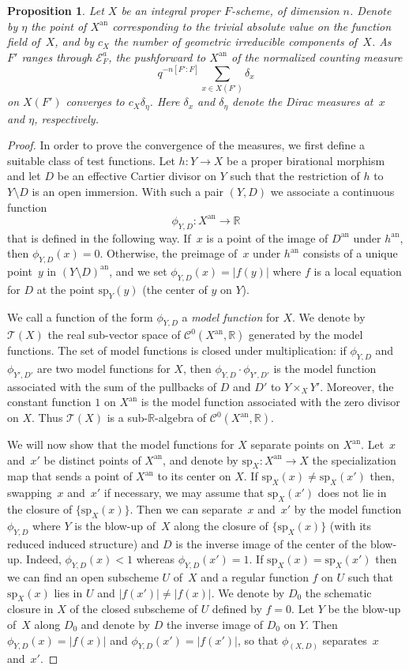 \documentclass[JEP,XML,SOM,Unicode,NoFloatCountersInSection]{cedram}
\let\mathcal\mathscr
\newtheorem{prop}[equation]{Proposition}
\theoremstyle{definition}
\numberwithin{equation}{subsection}
\newcommand{\R}{\ensuremath{\mathbb{R}}}
\newcommand{\an}{\mathrm{an}}
\newcommand{\spe}{\mathrm{sp}}
\begin{document}
\begin{prop}\label{prop:langweil}
Let $X$ be an integral proper $F$-scheme, of dimension $n$.
Denote by $\eta$ the point of $X^{\an}$ corresponding to the trivial absolute value on the function field of~$X$, and by $c_X$ the number of geometric irreducible components of~$X$.
As $F'$ ranges through $\mathcal{E}_F^a$, the pushforward to $X^{\an}$ of the normalized counting measure
\[
q^{-n[F'\colon F]}\sum_{x\in X(F')}\delta_x
\]
on $X(F')$
converges to $c_X\delta_{\eta}$. Here
$\delta_x$ and $\delta_\eta$ denote the Dirac measures at~$x$ and $\eta$, respectively.
\end{prop}
\begin{proof}
In order to prove the convergence of the measures, we first define a suitable class of test functions. Let $h\colon Y\to X$ be a proper birational morphism and let $D$ be an effective Cartier divisor on $Y$ such that the restriction of $h$ to $Y\setminus D$ is an open immersion. With such a pair $(Y,D)$ we associate a continuous function
\[
\phi_{Y,D}\colon X^{\an}\to \R
\]
that is defined in the following way.
If~$x$ is a point of the image of $D^{\an}$ under $h^{\an}$, then $\phi_{Y,D}(x)=0$.
Otherwise, the preimage of~$x$ under $h^{\an}$ consists of a unique point~$y$ in $(Y\setminus D)^{\an}$, and we set $\phi_{Y,D}(x)=|f(y)|$ where $f$ is a local equation for $D$ at the point $\spe_{Y}(y)$ (the center of $y$ on $Y$).

We call a function of the form $\phi_{Y,D}$ a {\em model function} for $X$.
We denote by $\mathcal{T}(X)$ the real sub-vector space of $\mathcal{C}^0(X^{\an},\R)$ generated by the model functions.
The set of model functions is closed under multiplication: if $\phi_{Y,D}$ and $\phi_{Y',D'}$ are two model functions for $X$, then $\phi_{Y,D}\cdot \phi_{Y',D'}$ is the model function associated with the sum of the pullbacks of $D$ and $D'$ to $Y\times_X Y'$.
Moreover, the constant function $1$ on $X^{\an}$ is the model function associated with the zero divisor on $X$.
Thus $\mathcal{T}(X)$ is a sub-$\R$-algebra of $\mathcal{C}^0(X^{\an},\R)$.

We will now show that the model functions for $X$ separate points on $X^{\an}$. Let~$x$ and~$x'$ be distinct points of $X^{\an}$, and denote by $\spe_X\colon X^{\an}\to X$ the specialization map that sends a point of $X^{\an}$ to its center on $X$.
If $\spe_X(x)\neq \spe_X(x')$ then, swapping~$x$ and~$x'$ if necessary, we may assume that
$\spe_X(x')$ does not lie in the closure of $\{\spe_X(x)\}$.
Then we can separate~$x$ and~$x'$ by the model function $\phi_{Y,D}$ where $Y$ is the blow-up of~$X$ along the closure of $\{\spe_X(x)\}$ (with its reduced induced structure) and $D$ is the inverse image of the center of the blow-up. Indeed, $\phi_{Y,D}(x)<1$ whereas $\phi_{Y,D}(x')=1$. If $\spe_X(x)= \spe_X(x')$ then we can find an open subscheme $U$ of~$X$ and a regular function $f$ on $U$ such that $\spe_X(x)$ lies in $U$ and
$|f(x')|\neq |f(x)|$. We denote by $D_0$ the schematic closure in $X$ of the closed subscheme of $U$ defined by $f=0$. Let $Y$ be the blow-up of~$X$ along $D_0$ and denote by $D$ the inverse image of $D_0$ on $Y$. Then $\phi_{Y,D}(x)=|f(x)|$ and $\phi_{Y,D}(x')=|f(x')|$, so that $\phi_{(X,D)}$ separates~$x$ and~$x'$.


\end{proof}
\end{document}
